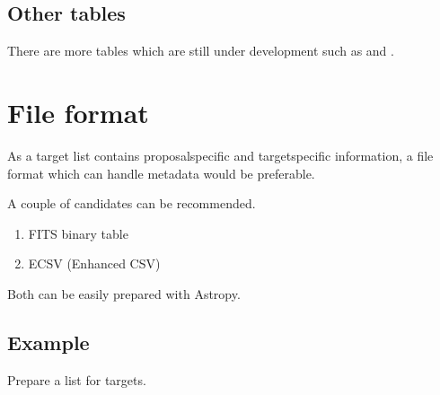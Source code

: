 \documentclass[letterpaper,10pt,english]{sphinxmanual}
\begin{document}
\subsection{Other tables}
\label{\detokenize{input_target_list:other-tables}}
\sphinxAtStartPar
There are more tables which are still under development such as  and .


\section{File format}
\label{\detokenize{input_target_list:file-format}}
\sphinxAtStartPar
As a target list contains proposal\sphinxhyphen{}specific and target\sphinxhyphen{}specific information, a file format which can handle metadata would be preferable.

\sphinxAtStartPar
A couple of candidates can be recommended.
\begin{enumerate}
%
\item {} 
\sphinxAtStartPar
FITS binary table

\item {} 
\sphinxAtStartPar
ECSV (Enhanced CSV)

\end{enumerate}

\sphinxAtStartPar
Both can be easily prepared with Astropy.


\subsection{Example}
\label{\detokenize{input_target_list:example}}
\sphinxAtStartPar
Prepare a list for targets.
\end{document}
